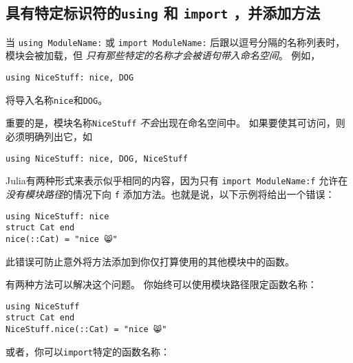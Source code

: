 \hypertarget{54362131503587802}{}


\subsection{具有特定标识符的\texttt{using} 和 \texttt{import} ，并添加方法}



当 \texttt{using ModuleName:} 或 \texttt{import ModuleName:} 后跟以逗号分隔的名称列表时，模块会被加载，但 \emph{只有那些特定的名称才会被语句带入命名空间}。 例如，




\begin{verbatim}
using NiceStuff: nice, DOG
\end{verbatim}



将导入名称\texttt{nice}和\texttt{DOG}。



重要的是，模块名称\texttt{NiceStuff} \emph{不会}出现在命名空间中。 如果要使其可访问，则必须明确列出它，如




\begin{verbatim}
using NiceStuff: nice, DOG, NiceStuff
\end{verbatim}



Julia有两种形式来表示似乎相同的内容，因为只有 \texttt{import ModuleName:f} 允许在 \emph{没有模块路径}的情况下向 \texttt{f} 添加方法。也就是说，以下示例将给出一个错误：




\begin{verbatim}
using NiceStuff: nice
struct Cat end
nice(::Cat) = "nice 😸"
\end{verbatim}



此错误可防止意外将方法添加到你仅打算使用的其他模块中的函数。



有两种方法可以解决这个问题。 你始终可以使用模块路径限定函数名称：




\begin{verbatim}
using NiceStuff
struct Cat end
NiceStuff.nice(::Cat) = "nice 😸"
\end{verbatim}



或者，你可以\texttt{import}特定的函数名称：




